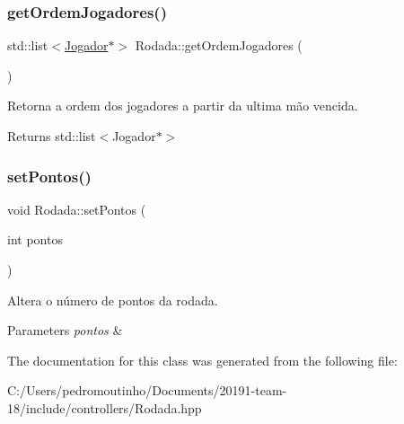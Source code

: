 \subsubsection{\texorpdfstring{getOrdemJogadores()}{getOrdemJogadores()}}
{\footnotesize\ttfamily std\+::list$<$\mbox{\hyperlink{class_jogador}{Jogador}}$\ast$$>$ Rodada\+::get\+Ordem\+Jogadores (\begin{DoxyParamCaption}{ }\end{DoxyParamCaption})}



Retorna a ordem dos jogadores a partir da ultima mão vencida. 

\begin{DoxyReturn}{Returns}
std\+::list$<$\+Jogador$\ast$$>$ 
\end{DoxyReturn}
\mbox{\label{class_rodada_aa8ca4b5f5b62991292a33188a1004fd1}} 
\subsubsection{\texorpdfstring{setPontos()}{setPontos()}}
{\footnotesize\ttfamily void Rodada\+::set\+Pontos (\begin{DoxyParamCaption}\item[{int}]{pontos }\end{DoxyParamCaption})}



Altera o número de pontos da rodada. 


\begin{DoxyParams}{Parameters}
{\em pontos} & \\
\hline
\end{DoxyParams}


The documentation for this class was generated from the following file\+:\begin{DoxyCompactItemize}
\item 
C\+:/\+Users/pedromoutinho/\+Documents/20191-\/team-\/18/include/controllers/Rodada.\+hpp\end{DoxyCompactItemize}
